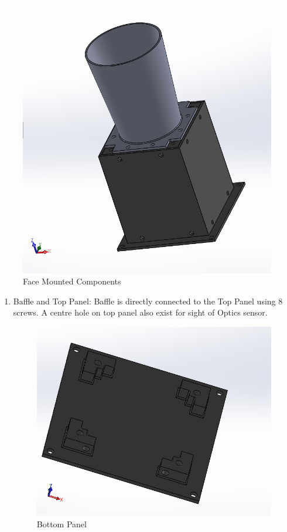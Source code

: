 \documentclass[../../main.tex]{subfiles}
\begin{document}
\begin{enumerate}
\begin{figure}[H]
        \includegraphics[scale=0.5]{Figures/Mechanical/side.png}
        \caption{Face Mounted Components}
        \label{fig:sys_CAD}
    \end{figure}
          
    \begin{enumerate}
    \item Baffle and Top Panel: Baffle is directly connected to the Top Panel using 8 screws. A centre hole on top panel also exist for sight of Optics sensor.
  
        \begin{figure}[H]
        \centering
        \includegraphics[scale=0.5]{Figures/Mechanical/bottom.png}
        \caption{Bottom Panel}
        \label{fig:sys_CAD}
    \end{figure}
  

\end{enumerate}
\end{enumerate}
\end{document}
